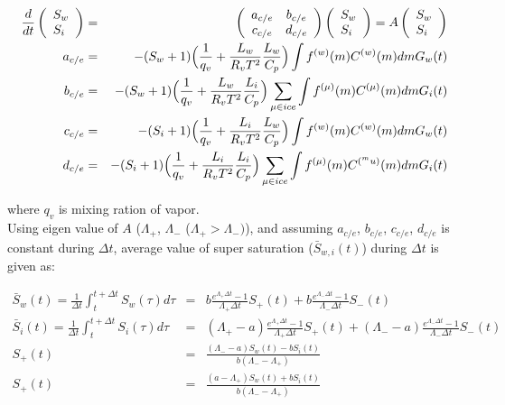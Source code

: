 \begin{eqnarray}
\frac{d}{dt}\left(
\begin{array}{l}
S_{w}\\
S_{i}\\
\end{array}\right )
&=&
\left(
\begin{array}{cc}
a_{c/e}& b_{c/e}\\
c_{c/e}& d_{c/e}
\end{array}\right)
\left(
\begin{array}{l}
S_{w}\\
S_{i}
\end{array}\right)
=
A
\left(
\begin{array}{l}
S_{w}\\
S_{i}
\end{array}\right)\label{s10-13}\\
a_{c/e}&=&-(S_{w}+1)\Bigl(\frac{1}{q_{v}}+\frac{L_{w}}{R_{v}T^{2}}\frac{L_{w}}{C_{p}}\Bigr )\int f^{(w)}(m)C^{(w)}(m)dm G_{w}(t)\nonumber\\
b_{c/e}&=&-(S_{w}+1)\Bigl(\frac{1}{q_{v}}+\frac{L_{w}}{R_{v}T^{2}}\frac{L_{i}}{C_{p}}\Bigr ) \sum_{\mu \in ice}\int f^{(\mu)}(m)C^{(\mu)}(m)dm G_{i}(t)\nonumber\\
c_{c/e}&=&-(S_{i}+1)\Bigl(\frac{1}{q_{v}}+\frac{L_{i}}{R_{v}T^{2}}\frac{L_{w}}{C_{p}}\Bigr ) \int f^{(w)}(m)C^{(w)}(m)dm G_{w}(t)\nonumber\\
d_{c/e}&=&-(S_{i}+1)\Bigl(\frac{1}{q_{v}}+\frac{L_{i}}{R_{v}T^{2}}\frac{L_{i}}{C_{p}}\Bigr ) \sum_{\mu \in ice}\int f^{(\mu)}(m)C^{(^mu)}(m)dm G_{i}(t)\nonumber
\end{eqnarray}


where $q_{v}$ is mixing ration of vapor. \\
Using eigen value of $A$ ($\Lambda_{+}$, $\Lambda_{-}$ ($\Lambda_{+}>\Lambda_{-})$), and assuming $a_{c/e}$, $b_{c/e}$, $c_{c/e}$, $d_{c/e}$ is constant during $\Delta t$, average value of super saturation ($\bar{S}_{w,i}(t)$) during $\Delta t$ is given as:

\begin{eqnarray}
\bar{S}_{w}(t)=\frac{1}{\Delta t}\int_{t}^{t+\Delta t}S_{w}(\tau)d\tau&=&b\frac{e^{\Lambda_{+}\Delta t}-1}{\Lambda_{+}\Delta t}S_{+}(t)+b\frac{e^{\Lambda_{-}\Delta t}-1}{\Lambda_{-}\Delta t}S_{-}(t)\nonumber\\
\bar{S}_{i}(t)=\frac{1}{\Delta t}\int_{t}^{t+\Delta t}S_{i}(\tau)d\tau&=&(\Lambda_{+}-a)\frac{e^{\Lambda_{+}\Delta t}-1}{\Lambda_{+}\Delta t}S_{+}(t)+(\Lambda_{-}-a)\frac{e^{\Lambda_{-}\Delta t}-1}{\Lambda_{-}\Delta t}S_{-}(t)\nonumber\\
S_{+}(t)&=&\frac{(\Lambda_{-}-a)S_{w}(t)-bS_{i}(t)}{b(\Lambda_{-}-\Lambda_{+})}\nonumber\\
S_{+}(t)&=&\frac{(a-\Lambda_{+})S_{w}(t)+bS_{i}(t)}{b(\Lambda_{-}-\Lambda_{+})}\nonumber
\end{eqnarray}

